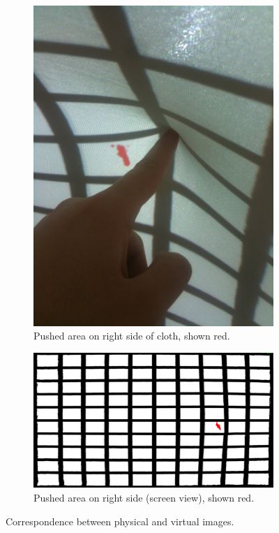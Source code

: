 \documentclass[]{article}
\begin{document}
\begin{figure}[!hbtp]
\centering
\begin{subfigure}{.5\textwidth}
  \centering
  \includegraphics[width=0.9\linewidth]{figures/RedRightDotPhysical.JPG}
  \caption{Pushed area on right side of cloth, shown red.}
  \label{fig:RedRightDotPhysical.JPG}
\end{subfigure}%
\begin{subfigure}{.5\textwidth}
  \centering
  \includegraphics[width=0.9\linewidth]{figures/RedRightDot.JPG}
  \caption{Pushed area on right side (screen view), shown red.}
  \label{fig:RedRightDot.JPG}
\end{subfigure}
\caption{Correspondence between physical and virtual images.}
\label{fig:RightPointCalibration}
\end{figure}
\end{document}
